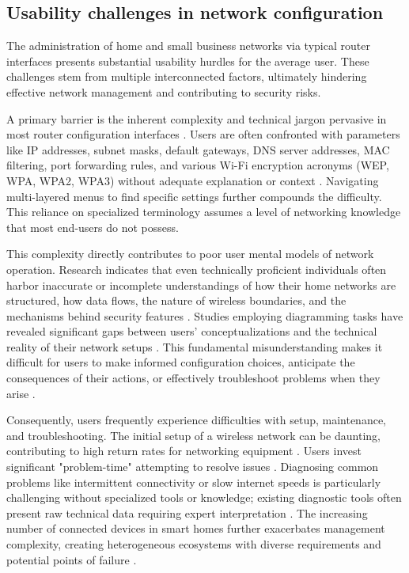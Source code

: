 \subsection{Usability challenges in network configuration}
The administration of home and small business networks via typical router interfaces presents substantial usability hurdles for the average user. These challenges stem from multiple interconnected factors, ultimately hindering effective network management and contributing to security risks.

A primary barrier is the inherent complexity and technical jargon pervasive in most router configuration interfaces \cite{home_network_challenges}. Users are often confronted with parameters like IP addresses, subnet masks, default gateways, DNS server addresses, MAC filtering, port forwarding rules, and various Wi-Fi encryption acronyms (WEP, WPA, WPA2, WPA3) without adequate explanation or context \cite{home_network_challenges}. Navigating multi-layered menus to find specific settings further compounds the difficulty. This reliance on specialized terminology assumes a level of networking knowledge that most end-users do not possess.

This complexity directly contributes to poor user mental models of network operation. Research indicates that even technically proficient individuals often harbor inaccurate or incomplete understandings of how their home networks are structured, how data flows, the nature of wireless boundaries, and the mechanisms behind security features \cite{home_network_challenges}. Studies employing diagramming tasks have revealed significant gaps between users' conceptualizations and the technical reality of their network setups \cite{router_logs}. This fundamental misunderstanding makes it difficult for users to make informed configuration choices, anticipate the consequences of their actions, or effectively troubleshoot problems when they arise \cite{router_logs}.

Consequently, users frequently experience difficulties with setup, maintenance, and troubleshooting. The initial setup of a wireless network can be daunting, contributing to high return rates for networking equipment \cite{home_network_challenges}. Users invest significant "problem-time" attempting to resolve issues \cite{diagnostic_issues}. Diagnosing common problems like intermittent connectivity or slow internet speeds is particularly challenging without specialized tools or knowledge; existing diagnostic tools often present raw technical data requiring expert interpretation \cite{router_logs}. The increasing number of connected devices in smart homes further exacerbates management complexity, creating heterogeneous ecosystems with diverse requirements and potential points of failure \cite{iot_security_challenges}.

